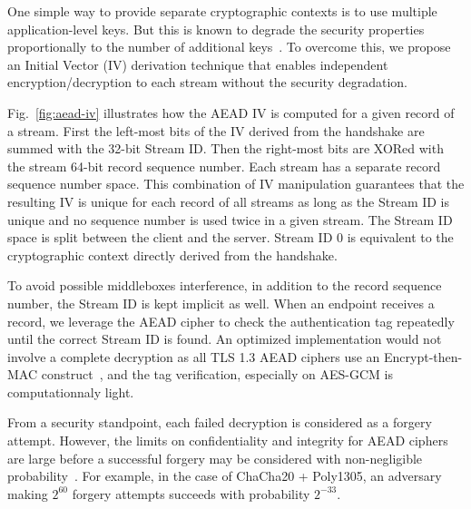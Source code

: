 One simple way to provide separate cryptographic contexts is to use multiple application-level keys. But this is known to degrade the security properties proportionally to the number of additional keys~\cite{chatterjee2011another}. To overcome this, we propose an Initial Vector (IV) derivation technique that enables independent encryption/decryption to each stream without the security degradation.

Fig.~\ref{fig:aead-iv} illustrates how the AEAD IV is computed for a
given \tcpls record of a \tcpls stream. First the left-most bits of the IV derived from the \tls handshake are summed with the 32-bit \tcpls Stream ID. Then the right-most bits are XORed with the stream 64-bit record sequence number. Each \tcpls stream has a separate record sequence number space. This combination of IV manipulation guarantees that the resulting IV is unique for each record of all \tcpls streams as long as the Stream ID is unique and no sequence number is used twice in a given stream. The Stream ID space is split between the client and the server. Stream ID 0 is equivalent to the cryptographic context directly derived from the handshake.

To avoid possible middleboxes interference, in addition to the record sequence number, the \tcpls Stream ID is kept implicit as well. When an endpoint receives a \tcpls record, we leverage the AEAD cipher to check the authentication tag repeatedly until the correct \tcpls Stream ID is found. An optimized implementation would not involve a complete decryption as all TLS 1.3 AEAD ciphers use an Encrypt-then-MAC construct~\cite{rfc7366, rfc8446}, and the tag verification, especially on AES-GCM is computationnaly light.

From a security standpoint, each failed decryption is considered as a forgery attempt. However, the limits on confidentiality and integrity for AEAD ciphers are large before a successful forgery may be considered with non-negligible probability~\cite{luykx2015limits, aeadlimits}. For example, in the case of ChaCha20 + Poly1305, an adversary making $2^{60}$ forgery attempts succeeds with probability $2^{-33}$.


